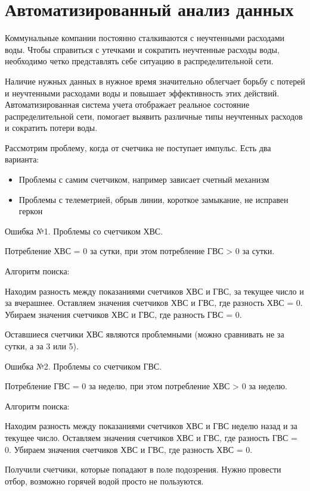 
\section{Автоматизированный анализ данных}

Коммунальные компании постоянно сталкиваются с неучтенными расходами воды.
Чтобы справиться с утечками и сократить неучтенные расходы воды, необходимо четко представлять себе ситуацию в распределительной сети. \cite{smartcity}

Наличие нужных данных в нужное время значительно облегчает борьбу с потерей и неучтенными расходами воды и повышает эффективность этих действий. Автоматизированная система учета отображает реальное состояние распределительной сети, помогает выявить различные типы неучтенных расходов и сократить потери воды. 

Рассмотрим проблему, когда от счетчика не поступает импульс. Есть два варианта:
\begin{itemize}
	\item Проблемы с самим счетчиком, например зависает счетный механизм
	\item Проблемы с телеметрией, обрыв линии, короткое замыкание, не исправен геркон
\end{itemize}

Ошибка №1. Проблемы со счетчиком ХВС. 

Потребление ХВС = 0 за сутки, при этом потребление ГВС > 0 за сутки.

Алгоритм поиска:

Находим разность между показаниями счетчиков ХВС и ГВС, за текущее число и за вчерашнее.
Оставляем значения счетчиков ХВС и ГВС, где разность ХВС = 0.
Убираем значения счетчиков ХВС и ГВС, где разность ГВС = 0.

Оставшиеся счетчики ХВС являются проблемными (можно сравнивать не за сутки, а за 3 или 5).

Ошибка №2. Проблемы со счетчиком ГВС.

Потребление ГВС = 0 за неделю, при этом потребление ХВС > 0 за неделю.

Алгоритм поиска:

Находим разность между показаниями счетчиков ХВС и ГВС неделю назад и за текущее число.
Оставляем значения счетчиков ХВС и ГВС, где разность ГВС = 0.
Убираем значения счетчиков ХВС и ГВС, где разность ХВС = 0.

Получили счетчики, которые попадают в поле подозрения.
Нужно провести отбор, возможно горячей водой просто не пользуются.

